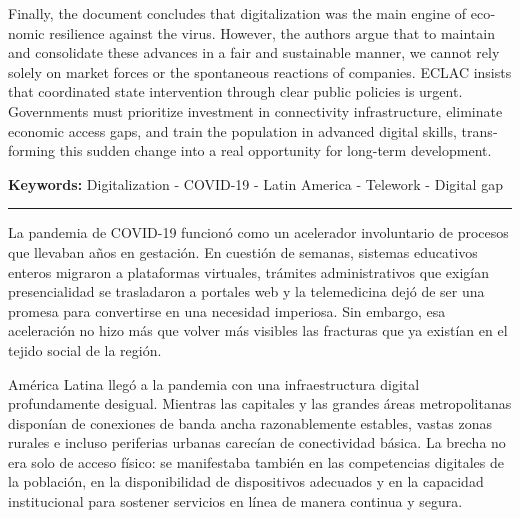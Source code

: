 \begin{tcolorbox}[colback=brown!8!white,colframe=brown!8!white,boxrule=0pt,arc=2pt,left=4pt,right=4pt,top=3pt,bottom=3pt,before skip=4pt,after skip=4pt]
\begin{otherlanguage}{english}
Finally, the document concludes that digitalization was the main engine of economic resilience against the virus. However, the authors argue that to maintain and consolidate these advances in a fair and sustainable manner, we cannot rely solely on market forces or the spontaneous reactions of companies. ECLAC insists that coordinated state intervention through clear public policies is urgent. Governments must prioritize investment in connectivity infrastructure, eliminate economic access gaps, and train the population in advanced digital skills, transforming this sudden change into a real opportunity for long-term development.
\par\smallskip\noindent\textbf{Keywords:} Digitalization - COVID-19 - Latin America - Telework - Digital gap
\end{otherlanguage}
\end{tcolorbox}

\bigskip
\noindent\rule{\linewidth}{0.4pt}
\bigskip

La pandemia de COVID-19 funcionó como un acelerador involuntario de procesos que llevaban años en gestación. En cuestión de semanas, sistemas educativos enteros migraron a plataformas virtuales, trámites administrativos que exigían presencialidad se trasladaron a portales web y la telemedicina dejó de ser una promesa para convertirse en una necesidad imperiosa. Sin embargo, esa aceleración no hizo más que volver más visibles las fracturas que ya existían en el tejido social de la región.

América Latina llegó a la pandemia con una infraestructura digital profundamente desigual. Mientras las capitales y las grandes áreas metropolitanas disponían de conexiones de banda ancha razonablemente estables, vastas zonas rurales e incluso periferias urbanas carecían de conectividad básica. La brecha no era solo de acceso físico: se manifestaba también en las competencias digitales de la población, en la disponibilidad de dispositivos adecuados y en la capacidad institucional para sostener servicios en línea de manera continua y segura.

